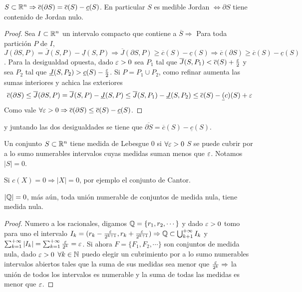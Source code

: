 \begin{theorem}
  \(S \subset \mathbb{R}^n \Rightarrow \overline{c}(\partial S) = \overline{c}(S) - \underline{c}(S)\). En particular \(S\) es medible Jordan \(\iff \partial S\) tiene contenido de Jordan nulo.
  \begin{proof}
    Sea \(I \subset \mathbb{R}^n\) un intervalo compacto que contiene a \(\overline{S} \Rightarrow\) Para toda partición \(P\) de \(I\), \(J(\partial S, P) = \overline{J}(S, P) - \underline{J}(S, P) \Rightarrow \overline{J}(\partial S, P) \geq \overline{c}(S) - \underline{c}(S) \Rightarrow \overline{c}(\partial S) \geq \overline{c}(S) - \underline{c}(S)\). Para la desigualdad opuesta, dado \(\varepsilon > 0\) sea \(P_1\) tal que \(\overline{J}(S, P_1) < \overline{c}(S) + \frac{\varepsilon}{2}\) y sea \(P_2\) tal que \(\underline{J}(S, P_2) > \underline{c}(S) - \frac{\varepsilon}{2}\). Si \(P = P_1 \cup P_2\), como refinar aumenta las sumas interiores y achica las exteriores \begin{align*}
      \overline{c}(\partial S) \leq \overline{J}(\partial S, P) = \overline{J}(S, P) - \underline{J}(S, P) \leq \overline{J}(S, P_1) - \underline{J}(S, P_2) \leq \overline{c}(S) - \underline(c)(S) + \varepsilon
    \end{align*}
    Como vale \(\forall \varepsilon > 0 \Rightarrow \overline{c}(\partial S) \leq \overline{c}(S) - \underline{c}(S)\).
  \end{proof} y juntando las dos desigualdades se tiene que \(\overline{\partial S} = \overline{c}(S) - \underline{c}(S)\).
\end{theorem}

\begin{definition}
  Un conjunto \(S \subset \mathbb{R}^n\) tiene medida de Lebesgue \(0\) si \(\forall \varepsilon > 0\) \(S\) se puede cubrir por a lo sumo numerables intervalos cuyas medidas suman menos que \(\varepsilon\). Notamos \(|S| = 0\).
\end{definition}

\begin{eg}
  Si \(c(X) = 0 \Rightarrow |X| = 0\), por ejemplo el conjunto de Cantor.
\end{eg}

\begin{eg}
  \(|\mathbb{Q}| = 0\), más aún, toda unión numerable de conjuntos de medida nula, tiene medida nula.
  \begin{proof}
    Numero a los racionales, digamos \(\mathbb{Q} = \{r_1, r_2, \cdots\}\) y dado \(\varepsilon > 0\) tomo para uno el intervalo \(I_k = (r_k - \frac{\varepsilon}{2^{k+1}}, r_k + \frac{\varepsilon}{2^{k+1}}) \Rightarrow \mathbb{Q} \subset \bigcup_{k + 1}^{+\infty} I_k\) y \(\sum_{k = 1}^{+\infty} |I_k| = \sum_{k = 1}^{+\infty} \frac{\varepsilon}{2^k} = \varepsilon\).
    Si ahora \(F = \{F_1, F_2, \cdots\}\) son conjuntos de medida nula, dado \(\varepsilon > 0\) \(\forall k \in \mathbb{N}\) puedo elegir un cubrimiento por a lo sumo numerables intervalos abiertos tales que la suma de sus medidas sea menor que \(\frac{\varepsilon}{2^k} \Rightarrow\) la unión de todos los intervalos es numerable y la suma de todas las medidas es menor que \(\varepsilon\).
  \end{proof}
\end{eg}

